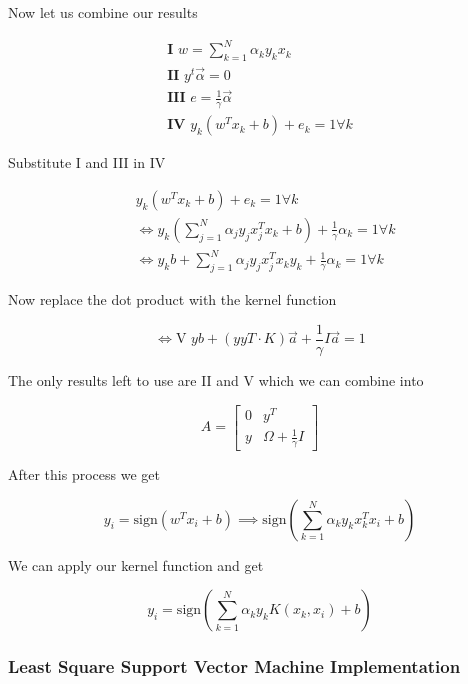 Now let us combine our results 

\begin{align*}
    \textbf{I } w = \sum_{k = 1}^{N} \alpha_k y_k x_k \\ 
    \textbf{II }  y^t \vec{\alpha} = 0 \\ 
    \textbf{III }  e = \frac{1}{\gamma} \vec{\alpha}\\ 
    \textbf{IV }  y_k (w^T x_k + b) + e_k = 1 \forall k
\end{align*}

Substitute I and III in IV 

\begin{align*}
    &y_k (w^T x_k + b) + e_k = 1 \forall k \\ 
    &\iff y_k (\sum_{j = 1}^{N} \alpha_j y_j x_j^T x_k + b) +  \frac{1}{\gamma} \alpha_k = 1 \forall k \\ 
    &\iff y_k b + \sum_{j = 1}^{N} \alpha_j y_j x_j^T x_k y_k +  \frac{1}{\gamma} \alpha_k = 1 \forall k 
\end{align*}

Now replace the dot product with the kernel function 

\[
    \iff \text{V } yb + (yyT \cdot K) \vec{a} + \frac{1}{\gamma} I\vec{a} = 1
\]

The only results left to use are II and V which we can combine into 

\[
    A = 
    \begin{bmatrix}
        0 & y^T \\ 
        y & \Omega + \frac{1}{\gamma} I
    \end{bmatrix} 
\]

After this process we get 

\[
    y_i = \mathrm{sign}(w^T x_i + b) \implies \mathrm{sign}\left(\sum_{k = 1}^{N} \alpha_k y_k x_k^T x_i + b\right)
\]

We can apply our kernel function and get

\[
    y_i = \mathrm{sign}\left(\sum_{k = 1}^{N} \alpha_k y_k K(x_k, x_i) + b\right)
\]


\subsubsection{Least Square Support Vector Machine Implementation}

